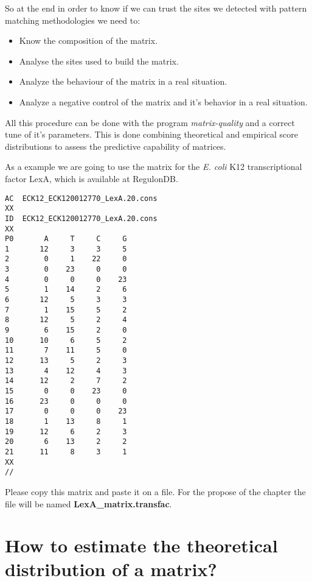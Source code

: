 So at the end in order to know if we can trust the sites we detected
with pattern matching methodologies we need to:

\begin{itemize}
\item Know the composition of the matrix.
\item Analyse the sites used to build the matrix.
\item Analyze the behaviour of the matrix in a real situation.
\item Analyze a negative control of the matrix and it's behavior in a
real situation.
\end{itemize}

All this procedure can be done with the program
\textit{matrix-quality} and a correct tune of it's parameters.  This
is done combining theoretical and empirical score distributions to
assess the predictive capability of matrices.

As a example we are going to use the matrix for the \textit{E. coli}
K12 transcriptional factor LexA, which is available at RegulonDB.

{\color{Blue} \begin{footnotesize} 
\begin{verbatim}
AC  ECK12_ECK120012770_LexA.20.cons
XX
ID  ECK12_ECK120012770_LexA.20.cons
XX
P0       A     T     C     G
1       12     3     3     5
2        0     1    22     0
3        0    23     0     0
4        0     0     0    23
5        1    14     2     6
6       12     5     3     3
7        1    15     5     2
8       12     5     2     4
9        6    15     2     0
10      10     6     5     2
11       7    11     5     0
12      13     5     2     3
13       4    12     4     3
14      12     2     7     2
15       0     0    23     0
16      23     0     0     0
17       0     0     0    23
18       1    13     8     1
19      12     6     2     3
20       6    13     2     2
21      11     8     3     1
XX
//
\end{verbatim} \end{footnotesize}
}

Please copy this matrix and paste it on a file.  For the propose of
the chapter the file will be named \textbf{LexA\_matrix.transfac}.


\section{How to estimate the theoretical distribution of a matrix? }

